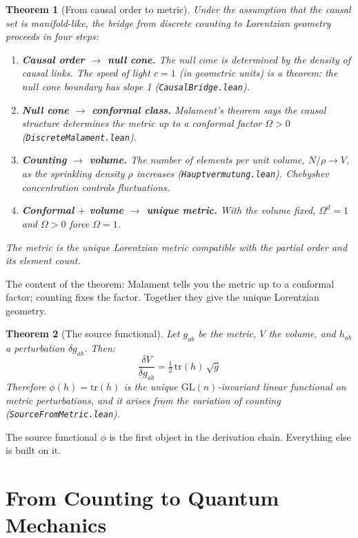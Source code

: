 \documentclass[11pt,letterpaper]{article}
\newtheorem{theorem}{Theorem}
\theoremstyle{remark}
\newcommand{\lean}[1]{\texttt{\small #1}}
\begin{document}
\begin{theorem}[From causal order to metric]
\label{thm:metric}
Under the assumption that the causal set is manifold-like, the bridge
from discrete counting to Lorentzian geometry proceeds in four steps:
\begin{enumerate}[nosep]
  \item \textbf{Causal order $\to$ null cone.} The null cone is
    determined by the density of causal links. The speed of light
    $c = 1$ (in geometric units) is a theorem: the null cone boundary
    has slope 1 (\lean{CausalBridge.lean}).
  \item \textbf{Null cone $\to$ conformal class.} Malament's theorem
    says the causal structure determines the metric up to a conformal
    factor $\Omega > 0$ (\lean{DiscreteMalament.lean}).
  \item \textbf{Counting $\to$ volume.} The number of elements per
    unit volume, $N/\rho \to V$, as the sprinkling density $\rho$
    increases (\lean{Hauptvermutung.lean}). Chebyshev concentration
    controls fluctuations.
  \item \textbf{Conformal $+$ volume $\to$ unique metric.} With the
    volume fixed, $\Omega^d = 1$ and $\Omega > 0$ force $\Omega = 1$.
\end{enumerate}
The metric is the unique Lorentzian metric compatible with the
partial order and its element count.
\end{theorem}

\noindent The content of the theorem: Malament tells you the metric
up to a conformal factor; counting fixes the factor. Together they
give the unique Lorentzian geometry.

\begin{theorem}[The source functional]
\label{thm:source}
Let $g_{ab}$ be the metric, $V$ the volume, and $h_{ab}$ a
perturbation $\delta g_{ab}$. Then:
\[
  \frac{\delta V}{\delta g_{ab}} = \tfrac{1}{2}\,\mathrm{tr}(h)
  \,\sqrt{g}
\]
Therefore $\phi(h) = \mathrm{tr}(h)$ is the unique
$\mathrm{GL}(n)$-invariant linear functional on metric perturbations,
and it arises from the variation of counting
(\lean{SourceFromMetric.lean}).
\end{theorem}

\noindent The source functional $\phi$ is the first object in the
derivation chain. Everything else is built on it.

\section{From Counting to Quantum Mechanics}
\label{sec:quantum}
\end{document}
